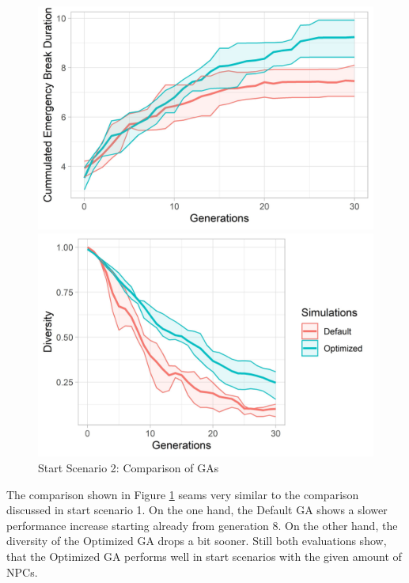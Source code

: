 \begin{figure}[ht] 
	\label{fig:evaluation:sim_2_ga_comparison}
	\begin{minipage}[b]{0.5\linewidth}
		\centering
		\includegraphics[width=1\linewidth]{simulations/evaluation/plots/sim_2_ga_generations} 
	\end{minipage}%
	\begin{minipage}[b]{0.5\linewidth}
		\centering
		\includegraphics[width=1\linewidth]{simulations/evaluation/plots/sim_2_ga_diversity} 
	\end{minipage} 
	\caption{Start Scenario 2: Comparison of GAs}
\end{figure}

The comparison shown in Figure \ref{fig:evaluation:sim_2_ga_comparison} seams very similar to the comparison discussed in start scenario 1. On the one hand, the Default GA shows a slower performance increase starting already from generation 8. On the other hand, the diversity of the Optimized GA drops a bit sooner. Still both evaluations show, that the Optimized GA performs well in start scenarios with the given amount of NPCs.

